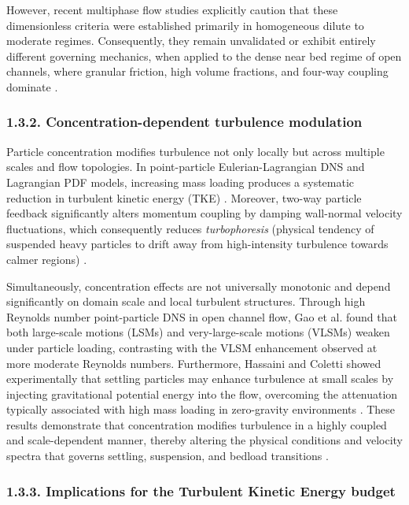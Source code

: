 However, recent multiphase flow studies explicitly caution that these dimensionless criteria were established primarily in homogeneous dilute to moderate regimes. Consequently, they remain unvalidated or exhibit entirely different governing mechanics, when applied to the dense near bed regime of open channels, where granular friction, high volume fractions, and four-way coupling dominate \cite{capecelatro__2018,chauchat__2017,PEND_Innocenti2021}.

\subsubsection{1.3.2. Concentration-dependent turbulence modulation}

Particle concentration modifies turbulence not only locally but across multiple scales and flow topologies. In point-particle Eulerian-Lagrangian DNS and Lagrangian PDF models, increasing mass loading produces a systematic reduction in turbulent kinetic energy (TKE) \cite{capecelatro__2018,PEND_Innocenti2021,PEND_Zhao2013}. Moreover, two-way particle feedback significantly alters momentum coupling by damping wall-normal velocity fluctuations, which consequently reduces \emph{turbophoresis} (physical tendency of suspended heavy particles to drift away from high-intensity turbulence towards calmer regions) \cite{PEND_Bassenne2018,PEND_Lee2019,PEND_Sardina2012,PEND_Zahtila2023}.

Simultaneously, concentration effects are not universally monotonic and depend significantly on domain scale and local turbulent structures. Through high Reynolds number point-particle DNS in open channel flow, Gao et al. \cite{gao__2023} found that both large-scale motions (LSMs) and very-large-scale motions (VLSMs) weaken under particle loading, contrasting with the VLSM enhancement observed at more moderate Reynolds numbers. Furthermore, Hassaini and Coletti \cite{hassaini__2022} showed experimentally that settling particles may enhance turbulence at small scales by injecting gravitational potential energy into the flow, overcoming the attenuation typically associated with high mass loading in zero-gravity environments \cite{brandt__2022,chouippe__2023}. These results demonstrate that concentration modifies turbulence in a highly coupled and scale-dependent manner, thereby altering the physical conditions and velocity spectra that governs settling, suspension, and bedload transitions \cite{capecelatro__2018,gao__2023,PEND_Zhao2013}.

\subsubsection{1.3.3. Implications for the Turbulent Kinetic Energy budget}

